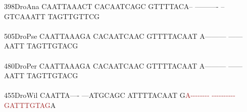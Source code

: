 \documentclass[11pt,twoside,reqno,a4paper]{article}
\begin{document}
{398\hspace*{1\charwidth}DroAna	CAATTAAACT	CACAATCAGC	GTTTTACA--	----------	--GTCAAATT	TAGTTGTTCG	\\
\hspace*{4\charwidth}\hspace*{7\charwidth}\hspace*{1\charwidth}\hspace*{1\charwidth}\hspace*{1\charwidth}\hspace*{1\charwidth}\hspace*{1\charwidth}\hspace*{1\charwidth}\\
505\hspace*{1\charwidth}DroPse	CAATTAAAGA	CACAATCAAC	GTTTTACAAT	A---------	------AATT	TAGTTGTACG	\\
\hspace*{4\charwidth}\hspace*{7\charwidth}\hspace*{1\charwidth}\hspace*{1\charwidth}\hspace*{1\charwidth}\hspace*{1\charwidth}\hspace*{1\charwidth}\hspace*{1\charwidth}\\
480\hspace*{1\charwidth}DroPer	CAATTAAAGA	CACAATCAAC	GTTTTACAAT	A---------	------AATT	TAGTTGTACG	\\
\hspace*{4\charwidth}\hspace*{7\charwidth}\hspace*{1\charwidth}\hspace*{1\charwidth}\hspace*{1\charwidth}\hspace*{1\charwidth}\hspace*{1\charwidth}\hspace*{1\charwidth}\\
455\hspace*{1\charwidth}DroWil	CAATTA----	---ATGCAGC	ATTTTACAAT	G\textcolor{Brown}{A}\textcolor{Brown}{-}\textcolor{Brown}{-}\textcolor{Brown}{-}\textcolor{Brown}{-}\textcolor{Brown}{-}\textcolor{Brown}{-}\textcolor{Brown}{-}\textcolor{Brown}{-}	\textcolor{Brown}{-}\textcolor{Brown}{-}\textcolor{Brown}{-}\textcolor{Brown}{-}\textcolor{Brown}{-}\textcolor{Brown}{-}\textcolor{Brown}{-}\textcolor{Brown}{-}\textcolor{Brown}{-}\textcolor{Brown}{-}	\textcolor{Brown}{G}\textcolor{Brown}{A}\textcolor{Brown}{T}\textcolor{Brown}{T}\textcolor{Brown}{T}\textcolor{Brown}{G}\textcolor{Brown}{T}\textcolor{Brown}{A}\textcolor{Brown}{G}A	\\
}
\end{document}
